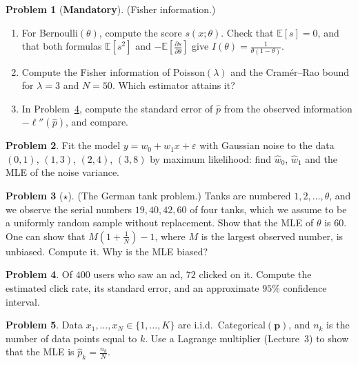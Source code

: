\documentclass[11pt]{article}
\theoremstyle{definition}
\newtheorem{problem}{Problem}[section]
\newcommand{\mandatory}{\textcolor{red!70!black}{\textbf{Mandatory}}}
\newcommand{\E}{\mathbb{E}}
\begin{document}
\begin{problem}[\mandatory]\label{pr:fisher}
    (Fisher information.)
    \begin{enumerate}[label=(\alph*)]
        \item For Bernoulli$(\theta)$, compute the score $s(x; \theta)$. Check that $\E[s] = 0$, and that both formulas $\E[s^2]$ and $-\E[\frac{\partial s}{\partial\theta}]$ give $I(\theta) = \frac{1}{\theta(1 - \theta)}$.
        \item Compute the Fisher information of Poisson$(\lambda)$ and the Cram\'er--Rao bound for $\lambda = 3$ and $N = 50$. Which estimator attains it?
        \item In Problem~\ref{pr:click-ci}, compute the standard error of $\hat p$ from the observed information $-\ell''(\hat p)$, and compare.
    \end{enumerate}
\end{problem}

\begin{problem}\label{pr:regression-mle}
    Fit the model $y = w_0 + w_1 x + \varepsilon$ with Gaussian noise to the data $(0, 1)$, $(1, 3)$, $(2, 4)$, $(3, 8)$ by maximum likelihood: find $\hat w_0$, $\hat w_1$ and the MLE of the noise variance.
\end{problem}

\begin{problem}[$\star$]\label{pr:german-tank}
    (The German tank problem.) Tanks are numbered $1, 2, \ldots, \theta$, and we observe the serial numbers $19, 40, 42, 60$ of four tanks, which we assume to be a uniformly random sample without replacement. Show that the MLE of $\theta$ is $60$. One can show that $M(1 + \frac{1}{N}) - 1$, where $M$ is the largest observed number, is unbiased. Compute it. Why is the MLE biased?
\end{problem}

\begin{problem}\label{pr:click-ci}
    Of $400$ users who saw an ad, $72$ clicked on it. Compute the estimated click rate, its standard error, and an approximate $95\%$ confidence interval.
\end{problem}

\begin{problem}\label{pr:categorical-mle}
    Data $x_1, \ldots, x_N \in \{1, \ldots, K\}$ are i.i.d.\ Categorical$(\mathbf{p})$, and $n_k$ is the number of data points equal to $k$. Use a Lagrange multiplier (Lecture~3) to show that the MLE is $\hat p_k = \frac{n_k}{N}$.
\end{problem}
\end{document}
